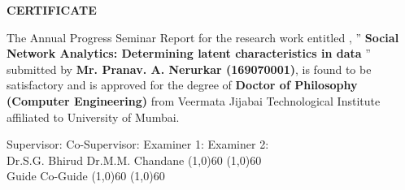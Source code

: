 \documentclass[oneside,11pt]{Classes/CUEDthesisPSnPDF}
\theoremstyle{definition}
\begin{document}
\setcounter{page}{1}

\vspace*{2\baselineskip}
\begin{center} \begin{Huge} \textbf{CERTIFICATE}\end{Huge} \end{center}
\vspace*{1\baselineskip}\vspace*{1\baselineskip} 

The Annual Progress Seminar Report for the research work entitled , ”
\textbf{Social Network Analytics: Determining latent characteristics in data}
” submitted by \textbf{Mr. Pranav. A. Nerurkar (169070001)}, is found to be satisfactory and is approved for the degree of \textbf{Doctor of Philosophy (Computer Engineering)} from Veermata Jijabai Technological Institute affiliated to University of Mumbai.
\vspace*{8\baselineskip}
\begin{center}
\end{center} 
\hspace{0in}Supervisor: \hspace{0.6in}Co-Supervisor: 
\hspace{0.6in}Examiner 1:   \hspace{0.6in} Examiner 2:\\
\hspace{0in}Dr.S.G. Bhirud \hspace{0.35in}Dr.M.M. Chandane
\hspace{0.25in}
\line(1,0){60}       \hspace{0.6in}          \line(1,0){60} \\
\hspace{0in}Guide   \hspace{0.96in}Co-Guide                 
\hspace{0.96in}\line(1,0){60}       \hspace{0.61in}        \line(1,0){60} \\
 
\newpage
\end{document}
